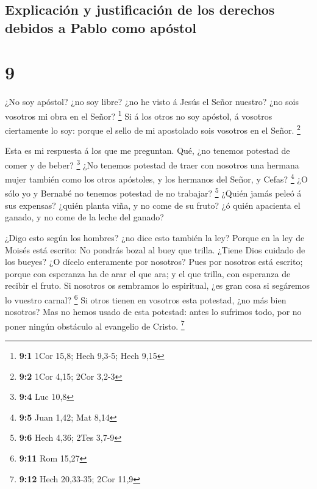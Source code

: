 \hypertarget{explicaciuxf3n-y-justificaciuxf3n-de-los-derechos-debidos-a-pablo-como-apuxf3stol}{%
\subsection{Explicación y justificación de los derechos debidos a Pablo
como
apóstol}\label{explicaciuxf3n-y-justificaciuxf3n-de-los-derechos-debidos-a-pablo-como-apuxf3stol}}

\hypertarget{section-8}{%
\section{9}\label{section-8}}

 ¿No soy apóstol? ¿no soy libre? ¿no he visto á Jesús el
Señor nuestro? ¿no sois vosotros mi obra en el Señor? \footnote{\textbf{9:1}
  1Cor 15,8; Hech 9,3-5; Hech 9,15}  Si á los otros no soy
apóstol, á vosotros ciertamente lo soy: porque el sello de mi apostolado
sois vosotros en el Señor. \footnote{\textbf{9:2} 1Cor 4,15; 2Cor 3,2-3}

 Esta es mi respuesta á los que me preguntan.
 Qué, ¿no tenemos potestad de comer y de beber?
\footnote{\textbf{9:4} Luc 10,8}  ¿No tenemos potestad de
traer con nosotros una hermana mujer también como los otros apóstoles, y
los hermanos del Señor, y Cefas? \footnote{\textbf{9:5} Juan 1,42; Mat
  8,14}  ¿O sólo yo y Bernabé no tenemos potestad de no
trabajar? \footnote{\textbf{9:6} Hech 4,36; 2Tes 3,7-9} 
¿Quién jamás peleó á sus expensas? ¿quién planta viña, y no come de su
fruto? ¿ó quién apacienta el ganado, y no come de la leche del ganado?

 ¿Digo esto según los hombres? ¿no dice esto también la
ley?  Porque en la ley de Moisés está escrito: No pondrás
bozal al buey que trilla. ¿Tiene Dios cuidado de los bueyes?
 ¿O dícelo enteramente por nosotros? Pues por nosotros
está escrito; porque con esperanza ha de arar el que ara; y el que
trilla, con esperanza de recibir el fruto.  Si nosotros
os sembramos lo espiritual, ¿es gran cosa si segáremos lo vuestro
carnal? \footnote{\textbf{9:11} Rom 15,27}  Si otros
tienen en vosotros esta potestad, ¿no más bien nosotros? Mas no hemos
usado de esta potestad: antes lo sufrimos todo, por no poner ningún
obstáculo al evangelio de Cristo. \footnote{\textbf{9:12} Hech 20,33-35;
  2Cor 11,9}

